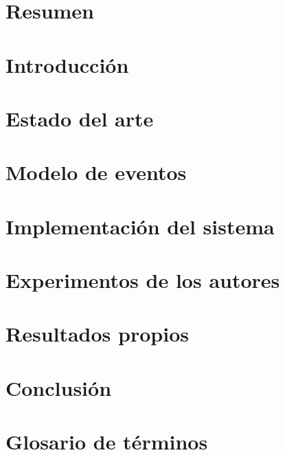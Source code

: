 \documentclass[titlepage,openright,twoside,a4paper,final,12pt]{book}
\author{Sergio Rodríguez Calvo}{D.~}{XXXXXXXXL}
\begin{document}
	\makeTitlePage

	\pagestyle{empty}
	\pagestyle{trinidadPhD}

	\tableofcontents
	\listoffigures

    \chapter{Resumen}
		

		\chapter{Introducción}
		

        \chapter{Estado del arte}
		

		\chapter{Modelo de eventos}
		

		\chapter{Implementación del sistema}
		

		\chapter{Experimentos de los autores}
		

		\chapter{Resultados propios}
		

    \chapter{Conclusión}
    

    \chapter*{Glosario de términos}
    

    \printbibliography
\end{document}
